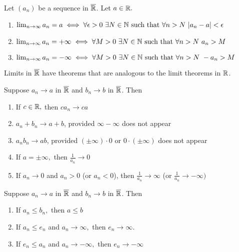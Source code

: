 \begin{remark}
    Let $(a_n)$ be a sequence in $\overline{\mathbb{R}}$. Let $a \in \mathbb{R}.$
    \begin{enumerate}[$(i)$]
        \item $\lim_{n\to \infty}a_n = a \iff \forall \epsilon > 0 ~\exists N \in \mathbb{N} \text{ such that } \forall n > N ~|a_n - a| < \epsilon$
        \item $\lim_{n\to \infty}a_n = +\infty \iff \forall M > 0 ~\exists N \in \mathbb{N} \text{ such that } \forall n > N ~a_n > M$
        \item $\lim_{n\to \infty}a_n = -\infty \iff \forall M > 0 ~\exists N \in \mathbb{N} \text{ such that } \forall n > N ~-a_n > M$
    \end{enumerate}
\end{remark}

Limits in $\overline{\mathbb{R}}$ have theorems that are analogous to the limit theorems in $\mathbb{R}$.

\begin{theorem}
    \label{ALTRbar}
    Suppose $a_n \to a$ in $\overline{\mathbb{R}}$ and $b_n \to b$ in $\overline{\mathbb{R}}$. Then
    \begin{enumerate}[$(i)$]
        \item If $c\in \mathbb{R},$ then $ca_n \to ca$
        \item $a_n + b_n \to a + b$, provided $\infty - \infty$ does not appear
        \item $a_n b_n \to ab$, provided $(\pm \infty)\cdot 0$ or $0 \cdot (\pm \infty)$ does not appear
        \item If $a=\pm \infty,$ then $\frac{1}{a_n} \to 0$
        \item If $a_n \to 0$ and $a_n > 0$ (or $a_n < 0$), then $\frac{1}{a_n} \to \infty$ (or $\frac{1}{a_n} \to -\infty)$
    \end{enumerate}
\end{theorem}

\begin{theorem}
    \label{OLTRbar}
    Suppose $a_n \to a$ in $\overline{\mathbb{R}}$ and $b_n \to b$ in $\overline{\mathbb{R}}$. Then
    \begin{enumerate}[$(i)$]
        \item If $a_n \leq b_n,$ then $a \leq b$
        \item If $a_n \leq e_n$ and $a_n \to \infty,$ then $e_n \to \infty$.
        \item If $e_n \leq a_n$ and $a_n \to -\infty,$ then $e_n \to -\infty$
    \end{enumerate}
\end{theorem}

